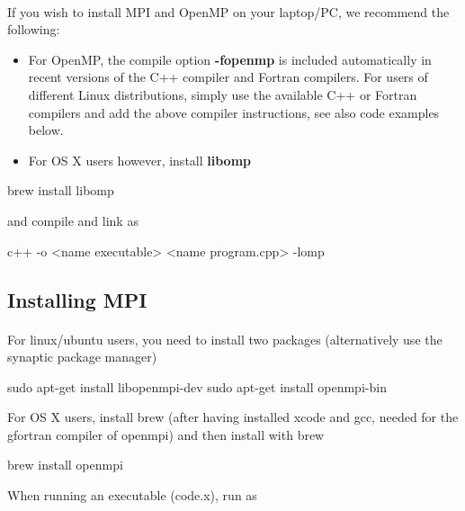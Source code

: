 \documentclass[%
oneside,                 %
final,                   %
10pt]{article}
\begin{document}
\paragraph{}
If you wish to install MPI and OpenMP 
on your laptop/PC, we recommend the following:

\begin{itemize}
\item For OpenMP, the compile option \textbf{-fopenmp} is included automatically in recent versions of the C++ compiler and Fortran compilers. For users of different Linux distributions, simply use the available C++ or Fortran compilers and add the above compiler instructions, see also code examples below.

\item For OS X users however, install \textbf{libomp}
\end{itemize}

\noindent


\bcppcod
  brew install libomp

\ecppcod

and compile and link as


\bcppcod
c++ -o <name executable> <name program.cpp>  -lomp

\ecppcod



\subsection{Installing MPI}

\paragraph{}
For linux/ubuntu users, you need to install two packages (alternatively use the synaptic package manager)



\bcppcod
  sudo apt-get install libopenmpi-dev
  sudo apt-get install openmpi-bin

\ecppcod

For OS X users, install brew (after having installed xcode and gcc, needed for the 
gfortran compiler of openmpi) and then install with brew


\bcppcod
   brew install openmpi

\ecppcod

When running an executable (code.x), run as
\end{document}
